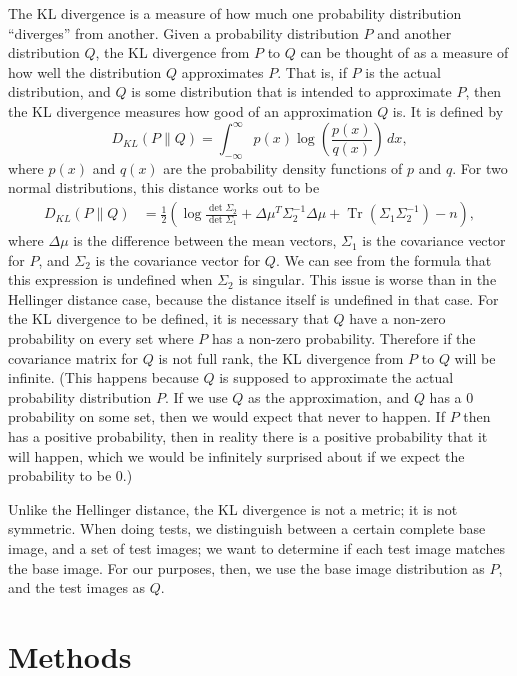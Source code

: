 \documentclass{article}
\newcommand*{\Pn}[1]{\left( #1 \right)}
\DeclareMathOperator{\Tr}{Tr}
\begin{document}
The KL divergence is a measure of how much one probability distribution ``diverges'' from another.\cite{wikikl} Given a probability distribution $P$ and another distribution $Q$, the KL divergence from $P$ to $Q$ can be thought of as a measure of how well the distribution $Q$ approximates $P$. That is, if $P$ is the actual distribution, and $Q$ is some distribution that is intended to approximate $P$, then the KL divergence measures how good of an approximation $Q$ is. It is defined by
\[
    D_{KL}(P\| Q)=\int_{-\infty}^\infty p(x)\log\Pn{\frac{p(x)}{q(x)}}\,dx,
\]
where $p(x)$ and $q(x)$ are the probability density functions of $p$ and $q$. For two normal distributions, this distance works out to be
\begin{align*}
    D_{KL}(P\| Q)
    &=\frac12\Pn{\log\frac{\det\Sigma_2}{\det\Sigma_1}+\Delta\mu^T\Sigma_2^{-1}\Delta\mu+\Tr(\Sigma_1\Sigma_2^{-1})-n},
\end{align*}
where $\Delta\mu$ is the difference between the mean vectors, $\Sigma_1$ is the covariance vector for $P$, and $\Sigma_2$ is the covariance vector for $Q$. We can see from the formula that this expression is undefined when $\Sigma_2$ is singular. This issue is worse than in the Hellinger distance case, because the distance itself is undefined in that case. For the KL divergence to be defined, it is necessary that $Q$ have a non-zero probability on every set where $P$ has a non-zero probability. Therefore if the covariance matrix for $Q$ is not full rank, the KL divergence from $P$ to $Q$ will be infinite. (This happens because $Q$ is supposed to approximate the actual probability distribution $P$. If we use $Q$ as the approximation, and $Q$ has a $0$ probability on some set, then we would expect that never to happen. If $P$ then has a positive probability, then in reality there is a positive probability that it will happen, which we would be infinitely surprised about if we expect the probability to be $0$.)

Unlike the Hellinger distance, the KL divergence is not a metric; it is not symmetric. When doing tests, we distinguish between a certain complete base image, and a set of test images; we want to determine if each test image matches the base image. For our purposes, then, we use the base image distribution as $P$, and the test images as $Q$.

\section{Methods}
\end{document}
